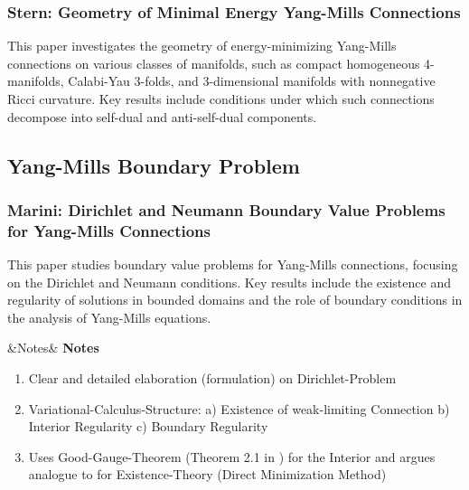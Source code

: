 \documentclass[10pt, letterpaper]{article}
\newenvironment{romanenum}[1][]
  {%
    \ifx&#1&
    \else
      \textbf{#1}\quad
    \fi
    \begin{enumerate}[label=\roman*)]
  }
  {%
    \end{enumerate}%
  }
\begin{document}
\subsubsection{Stern: Geometry of Minimal Energy Yang-Mills Connections \cite{stern2010minimal}}
This paper investigates the geometry of energy-minimizing Yang-Mills connections on various classes of manifolds, such as compact homogeneous 4-manifolds, Calabi-Yau 3-folds, and 3-dimensional manifolds with nonnegative Ricci curvature. Key results include conditions under which such connections decompose into self-dual and anti-self-dual components.


\vspace{1cm}

\subsection{Yang-Mills Boundary Problem}


\subsubsection{Marini: Dirichlet and Neumann Boundary Value Problems for Yang-Mills Connections \cite{marini1992boundary}} 
This paper studies boundary value problems for Yang-Mills connections, focusing on the Dirichlet and Neumann conditions. Key results include the existence and regularity of solutions in bounded domains and the role of boundary conditions in the analysis of Yang-Mills equations.

\begin{romanenum}[Notes]
    \item Clear and detailed elaboration (formulation) on Dirichlet-Problem 
    \item Variational-Calculus-Structure: a) Existence of weak-limiting Connection b) Interior Regularity c) Boundary Regularity
    \item Uses Good-Gauge-Theorem (Theorem 2.1 in \cite{uhlenbeck1982connections}) for the Interior and argues analogue to \cite{sedlacek1982direct} for Existence-Theory (Direct Minimization Method)
\end{romanenum}
\end{document}
